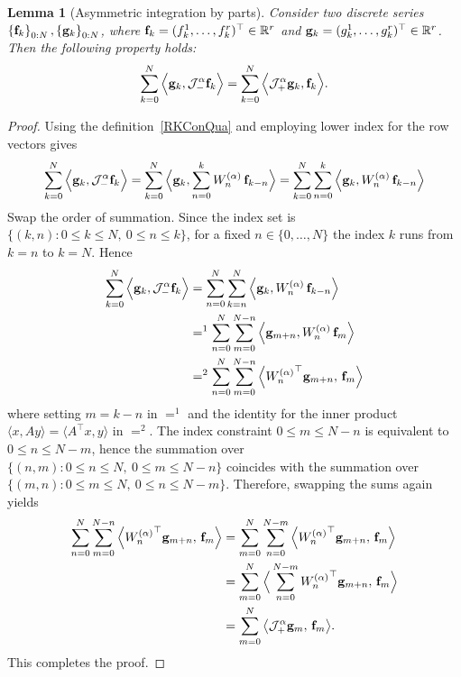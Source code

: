 \documentclass[a4paper,10pt,reqno]{amsart}
\newtheorem{lemma}{Lemma}[section]
\theoremstyle{definition}
\newcommand{\R}{\mathbb{R}}      %
\begin{document}
\begin{lemma}[Asymmetric integration by parts]\label{ConvPropertiesRK1}
Consider two discrete series $\left\{ {\bf f}_k\right\}_{0:N}, \left\{ {\bf g}_k\right\}_{0:N}$, where ${\bf f}_k=(f_k^1,\ldots,f_k^r)^\top\in \R^r$ and ${\bf g}_k=(g_k^1,\ldots,g_k^r)^\top\in \R^r$. Then the following property holds:
 \begin{equation}\label{AsymmetricInt:2}
\sum_{k=0}^{N}\Big\langle {\bf g}_k, \mathcal{J}_{-}^{\alpha}{\bf f }_k\Big\rangle=\sum_{k=0}^{N}\Big\langle \mathcal{J}_{+}^{\alpha}{\bf g}_k, {\bf f }_k\Big\rangle.
\end{equation}  
\end{lemma}
\begin{proof}
Using the definition~\eqref{RKConQua} and employing lower index for the row vectors gives
\[
\sum_{k=0}^{N}\Big\langle {\bf g}_k, \mathcal{J}_{-}^{\alpha}{\bf f }_k\Big\rangle=
\sum_{k=0}^{N}\Big\langle{\bf g}_k,\sum_{n=0}^{k}W_n^{(\alpha)}\,{\bf f}_{k-n}\Big\rangle=\sum_{k=0}^{N}\sum_{n=0}^{k}\Big\langle{\bf g}_k,W_n^{(\alpha)}\,{\bf f}_{k-n}\Big\rangle
\]
Swap the order of summation. Since the index set is
$\{(k,n):0\le k\le N,\ 0\le n\le k\}$, for a fixed $n\in\{0,\dots,N\}$
the index $k$ runs from $k=n$ to $k=N$. Hence
\begin{align*}
\sum_{k=0}^{N}\Big\langle {\bf g}_k, \mathcal{J}_{-}^{\alpha}{\bf f }_k\Big\rangle&=\sum_{n=0}^{N}\sum_{k=n}^{N}\Big\langle{\bf g}_k,W_n^{(\alpha)}\,{\bf f}_{k-n}\Big\rangle\\
&=^1\sum_{n=0}^{N}\sum_{m=0}^{N-n}\Big\langle{\bf g}_{m+n},W_n^{(\alpha)}\,{\bf f}_{m}\Big\rangle\\
&=^2\sum_{n=0}^{N}\sum_{m=0}^{N-n}\Big\langle {W_n^{(\alpha)}}^\top{\bf g}_{m+n},\,{\bf f}_{m}\Big\rangle
\end{align*}
where setting  $m=k-n$ in $=^1$  and  the identity for the inner product $\big\langle x,Ay\big\rangle=\big\langle A^\top x,y\big\rangle$ in $=^2$. The index constraint $0\le m\le N-n$ is equivalent to $0\le n\le N-m$, hence the summation over
$\{(n,m):0\le n\le N,\ 0\le m\le N-n\}$ coincides with the summation over
$\{(m,n):0\le m\le N,\ 0\le n\le N-m\}$. Therefore, swapping the sums again yields
\begin{align*}
\sum_{n=0}^{N}\sum_{m=0}^{N-n}\Big\langle {W_n^{(\alpha)}}^\top{\bf g}_{m+n},\,{\bf f}_{m}\Big\rangle
&=\sum_{m=0}^{N}\sum_{n=0}^{N-m}\Big\langle {W_n^{(\alpha)}}^\top{\bf g}_{m+n},\,{\bf f}_{m}\Big\rangle\\
&=\sum_{m=0}^{N}\Big\langle \sum_{n=0}^{N-m}{W_n^{(\alpha)}}^\top{\bf g}_{m+n},\,{\bf f}_{m}\Big\rangle\\
&=\sum_{m=0}^{N}\big\langle \mathcal J_+^\alpha{\bf g}_m,\,{\bf f}_m\big\rangle.
\end{align*}
This completes the proof.
\end{proof}
\end{document}
